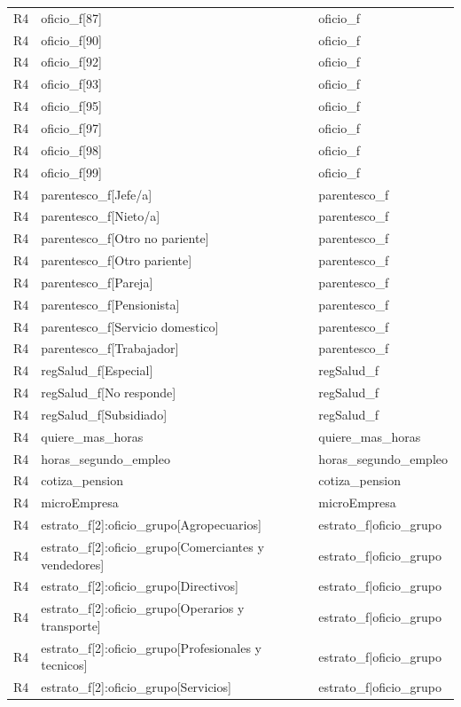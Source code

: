\begin{longtable}{lll}
R4 & oficio\_f[87] & oficio\_f \\
R4 & oficio\_f[90] & oficio\_f \\
R4 & oficio\_f[92] & oficio\_f \\
R4 & oficio\_f[93] & oficio\_f \\
R4 & oficio\_f[95] & oficio\_f \\
R4 & oficio\_f[97] & oficio\_f \\
R4 & oficio\_f[98] & oficio\_f \\
R4 & oficio\_f[99] & oficio\_f \\
R4 & parentesco\_f[Jefe/a] & parentesco\_f \\
R4 & parentesco\_f[Nieto/a] & parentesco\_f \\
R4 & parentesco\_f[Otro no pariente] & parentesco\_f \\
R4 & parentesco\_f[Otro pariente] & parentesco\_f \\
R4 & parentesco\_f[Pareja] & parentesco\_f \\
R4 & parentesco\_f[Pensionista] & parentesco\_f \\
R4 & parentesco\_f[Servicio domestico] & parentesco\_f \\
R4 & parentesco\_f[Trabajador] & parentesco\_f \\
R4 & regSalud\_f[Especial] & regSalud\_f \\
R4 & regSalud\_f[No responde] & regSalud\_f \\
R4 & regSalud\_f[Subsidiado] & regSalud\_f \\
R4 & quiere\_mas\_horas & quiere\_mas\_horas \\
R4 & horas\_segundo\_empleo & horas\_segundo\_empleo \\
R4 & cotiza\_pension & cotiza\_pension \\
R4 & microEmpresa & microEmpresa \\
R4 & estrato\_f[2]:oficio\_grupo[Agropecuarios] & estrato\_f|oficio\_grupo \\
R4 & estrato\_f[2]:oficio\_grupo[Comerciantes y vendedores] & estrato\_f|oficio\_grupo \\
R4 & estrato\_f[2]:oficio\_grupo[Directivos] & estrato\_f|oficio\_grupo \\
R4 & estrato\_f[2]:oficio\_grupo[Operarios y transporte] & estrato\_f|oficio\_grupo \\
R4 & estrato\_f[2]:oficio\_grupo[Profesionales y tecnicos] & estrato\_f|oficio\_grupo \\
R4 & estrato\_f[2]:oficio\_grupo[Servicios] & estrato\_f|oficio\_grupo \\

\end{longtable}
